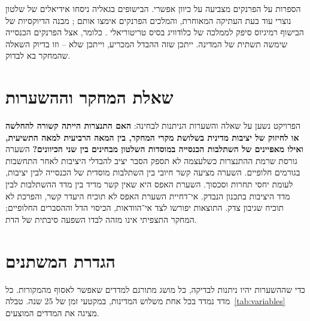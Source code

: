 הספרות על הפרנקים מצביעה על כיוון אפשרי. הבישופים בגאליה ניסחו אידיאלים של שלטון נוצרי עוד בעת העתיקה המאוחרת, והמלכים הפרנקים אימצו אותם \cite{moore2011sacred}; מבנה הדיוקסיות של הבישוף רמיגיוס סיפק לממלכה של כלוֹדוויג בסיס טריטוריאלי \cite{poveda2019clovis}. כלומר, אצל הפרנקים הכנסייה שימשה תשתית של המדינה. ייתכן שזה ההבדל המכריע, וייתכן שלא – וזו בדיוק השאלה שהמחקר בא לבדוק.

\section{שאלת המחקר וההשערות}
\label{sec:problem-question}

הפרויקט נשען על שאלה והשערות הניתנות לבחינה: \textbf{האם התנצרות הייתה קשורה להחלשה או לחיזוק של יציבות מדינית בשלושת מקרי המחקר, בין המאה הרביעית למאה התשיעית, ואילו מאפיינים של השתלבות הכנסייה במוסדות השלטון מבחינים בין שני הכיוונים?} השערה  גורסת שרמת ההתנצרות כשלעצמה לא תספק הסבר יציב להבדלי היציבות לאחר התחשבות בגורמים חלופיים. השערה  מציעה קשר חיובי בין השתלבות מוסדית של הכנסייה לבין יציבות, לעומת יחסי תחרות וסכסוך. השערת האפס  היא שאין קשר מדיד בין מדד ההשתלבות לבין מדד היציבות בתכנון הנבדק. אי־דחיית השערת האפס לא תוכיח היעדר קשר, והפרכת  לא תוכיח שגיבון צדק. התוצאות יפורשו לצד אי־הוודאות, הכיסוי הדל וההסברים החלופיים; המחקר התצפיתי אינו מזהה לבדו השפעה סיבתית של הדת.

\section{הגדרת המשתנים}
\label{sec:problem-variables}

כדי שההשערות יהיו ניתנות לבדיקה, כל מושג מתורגם למדדים שאפשר לאסוף מהמקורות. כל מדד נמדד בכל אחת משלוש המדינות, במקטעי זמן של 25 שנה. טבלה~\ref{tab:variables} מציגה את המדדים המוצעים.


